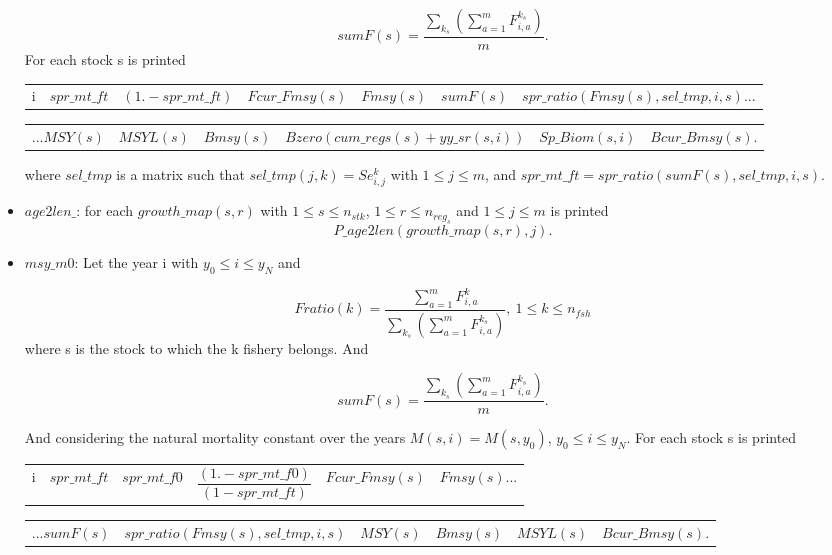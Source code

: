 \documentclass{article}
\begin{document}
\begin{itemize}
\begin{equation}
    sumF(s)= \dfrac{\sum_{k_s} \left(\sum_{a=1}^mF^{k_s}_{i,a}\right)}{m}.
\end{equation}
For each stock s is printed
\begin{center}
\begin{tabular}{c c c c c c c  }
    i & $spr\_mt\_ft$ & $(1.-spr\_mt\_ft)$ & $Fcur\_Fmsy(s)$ & $Fmsy(s)$ & $sumF(s)$ & $spr\_ratio(Fmsy(s),sel\_tmp,i,s)$... \\
\end{tabular}
\end{center}
\begin{center}
    \begin{tabular}{c c c c c c}
       ...$MSY(s)$  &  $MSYL(s)$ & $Bmsy(s) $ & $Bzero(cum\_regs(s)+yy\_sr(s,i))$ & $Sp\_Biom(s,i)$ & $Bcur\_Bmsy(s)$. \\
    \end{tabular}
\end{center}
where $sel\_tmp$ is a matrix such that $sel\_tmp(j,k)=Se^k_{i,j}$ with $1\leq j \leq m$, and $spr\_mt\_ft=spr\_ratio(sumF(s), sel\_tmp,i, s)$.

\item $age2len\_$: for each $growth\_map(s,r)$ with $1\leq s \leq n_{stk}$, $1\leq r \leq n_{reg_s}$ and $1\leq j \leq m$ is printed
\begin{equation*}
P\_age2len(growth\_map(s,r),j).
\end{equation*}

\item $msy\_m0$: Let the year i with $y_0 \leq i \leq y_N$ and

\begin{equation*}
    Fratio(k)= \dfrac{\sum_{a=1}^mF^k_{i,a}}{\sum_{k_s} \left(\sum_{a=1}^mF^{k_s}_{i,a}\right)}, \ 1\leq k \leq n_{fsh}
\end{equation*}
where s is the stock to which the k fishery belongs. And

\begin{equation}
    sumF(s)= \dfrac{\sum_{k_s} \left(\sum_{a=1}^mF^{k_s}_{i,a}\right)}{m}.
\end{equation}

And considering the natural mortality constant over the years $M(s,i)=M(s,y_0)$, $y_0\leq i \leq y_N$. For each stock s is printed
\begin{center}
    \begin{tabular}{c c c c c c} 
        i & $spr\_mt\_ft$  & $spr\_mt\_f0$ & $\dfrac{(1.-spr\_mt\_f0)}{(1-spr\_mt\_ft)}$ & $Fcur\_Fmsy(s)$ & $Fmsy(s)$...\\
    \end{tabular}
\end{center}
\begin{center}
    \begin{tabular}{c c c c c c }
        ...$sumF(s) $ & $spr\_ratio(Fmsy(s),sel\_tmp,i,s)$ & $MSY(s)$ & $Bmsy(s)$ & $MSYL(s)$ & $Bcur\_Bmsy(s)$.\\
    \end{tabular}
\end{center}


\end{itemize}
\end{document}
